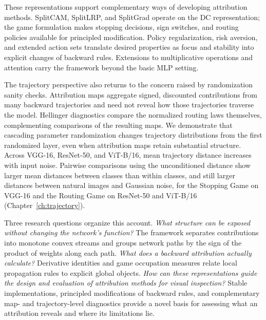These representations support complementary ways of developing attribution methods. SplitCAM, SplitLRP, and SplitGrad operate on the DC representation; the game formulation makes stopping decisions, sign switches, and routing policies available for principled modification. Policy regularization, risk aversion, and extended action sets translate desired properties as focus and stability into explicit changes of backward rules. Extensions to multiplicative operations and attention carry the framework beyond the basic MLP setting.

The trajectory perspective also returns to the concern raised by randomization sanity checks. Attribution maps aggregate signed, discounted contributions from many backward trajectories and need not reveal how those trajectories traverse the model. Hellinger diagnostics compare the normalized routing laws themselves, complementing comparisons of the resulting maps. We demonstrate that cascading parameter randomization changes trajectory distributions from the first randomized layer, even when attribution maps retain substantial structure. Across VGG-16, ResNet-50, and ViT-B/16, mean trajectory distance increases with input noise. Pairwise comparisons using the unconditioned distance show larger mean distances between classes than within classes, and still larger distances between natural images and Gaussian noise, for the Stopping Game on VGG-16 and the Routing Game on ResNet-50 and ViT-B/16 (Chapter~\ref{ch:trajectory}).

Three research questions organize this account. \emph{What structure can be exposed without changing the network's function?} The framework separates contributions into monotone convex streams and groups network paths by the sign of the product of weights along each path. \emph{What does a backward attribution actually calculate?} Derivative identities and game occupation measures relate local propagation rules to explicit global objects. \emph{How can these representations guide the design and evaluation of attribution methods for visual inspection?} Stable implementations, principled modifications of backward rules, and complementary map- and trajectory-level diagnostics provide a novel basis for assessing what an attribution reveals and where its limitations lie.

